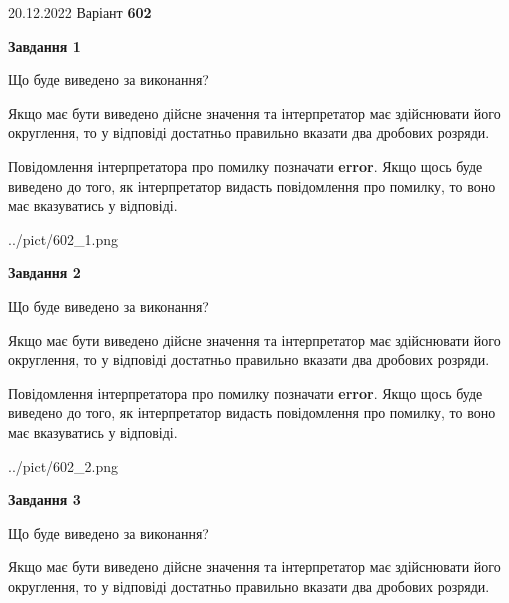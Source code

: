 \documentclass[12pt, ukrainian]{article}
\begin{document}
{20.12.2022 Варіант \No \textbf { 602 }\par}
{
\begin {Large}

{\begin {center}\textbf{Завдання 1}\end {center}}\par
Що буде виведено за виконання? \par

Якщо має бути виведено дійсне значення та інтерпретатор має здійснювати його округлення, 
то у відповіді достатньо правильно вказати два дробових розряди.

Повідомлення інтерпретатора про помилку позначати \textbf{error}.
Якщо щось буде виведено до того, як інтерпретатор видасть повідомлення про помилку, 
то воно має вказуватись у відповіді. \par

\begin{center}
	{../pict/602_1.png}
\end{center}
\newpage

{\begin {center}\textbf{Завдання 2}\end {center}}\par
Що буде виведено за виконання? \par

Якщо має бути виведено дійсне значення та інтерпретатор має здійснювати його округлення, 
то у відповіді достатньо правильно вказати два дробових розряди.

Повідомлення інтерпретатора про помилку позначати \textbf{error}.
Якщо щось буде виведено до того, як інтерпретатор видасть повідомлення про помилку, 
то воно має вказуватись у відповіді. \par

\begin{center}
	{../pict/602_2.png}
\end{center}
\newpage

{\begin {center}\textbf{Завдання 3}\end {center}}\par
Що буде виведено за виконання? \par

Якщо має бути виведено дійсне значення та інтерпретатор має здійснювати його округлення, 
то у відповіді достатньо правильно вказати два дробових розряди.


\end{Large}}
\end{document}
